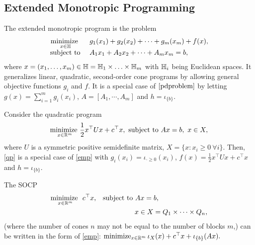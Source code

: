 {{\subsection{Extended Monotropic Programming}\label{sec:emp}
The extended monotropic program is the problem
\begin{equation}
\begin{array}{rl}
\underset{x\in\mathbb{H}}{\text{minimize  }} &~g_1(x_1)+g_2(x_2)+\cdots+g_m(x_m)+f(x),\\
\St &~A_1x_1+A_2x_2+\cdots+A_mx_m=b,
\end{array}\label{emp}
\end{equation}
where $x = (x_1, \ldots, x_m) \in \mathbb{H}=\mathbb{H}_1\times\ldots \times \mathbb{H}_m$ with $\mathbb{H}_i$ being Euclidean spaces. It generalizes linear, quadratic,  second-order cone programs by allowing  general objective functions $g_i$ and $f$.
It is a special case of $\eqref{pdproblem}$ by letting $g(x)=\displaystyle\sum_{i=1}^m g_i(x_i)$, $A=[A_1,\cdots, A_m]$ and 
$h=\iota_{\{b\}}$.
\begin{example}
Consider the quadratic program
\begin{equation}
\underset{x\in\mathbb{R}^m}{\textnormal{minimize }} \frac{1}{2}x^\top Ux+c^\top x,~\St~ Ax=b,~x\in X,\label{qp}
\end{equation}
where $U$ is a symmetric positive semidefinite matrix, $X=\{x:x_i \geq 0~\forall i\}$.
Then, \eqref{qp} is a special case of \eqref{emp}
with  $g_i(x_i)=\iota_{\cdot\geq 0}(x_i)$, $f(x)=\frac{1}{2}x^\top Ux+c^\top x$ and $h=\iota_{\{b\}}$.
\end{example}
\begin{example}
The SOCP
\begin{align*}
\underset{x\in\mathbb{R}^m}{\textnormal{minimize }} ~c^\top x,&\quad\St~ Ax=b,\\
&\hspace{56pt} x\in X=Q_1\times \cdots\times Q_{n},
\end{align*}
(where the number of cones $n$ may not be equal to the number of blocks $m$,) can be written in the form of \eqref{emp}: $\operatorname*{minimize}_{x\in\mathbb{R}^m} \iota_X(x)+c^\top x+\iota_{\{b\}}(Ax).$ %
\end{example}
}}
